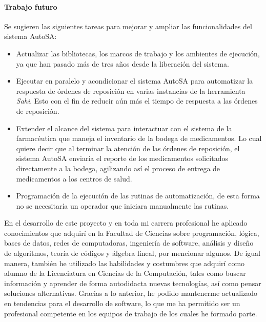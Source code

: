 \paragraph{Trabajo futuro\\}
Se sugieren las siguientes tareas para mejorar y ampliar las funcionalidades del sistema AutoSA:
\begin{itemize}
	\item Actualizar las bibliotecas, los marcos de trabajo y los ambientes de ejecución, ya que han pasado más de tres años desde la liberación del sistema.
	\item Ejecutar en paralelo y acondicionar el sistema AutoSA para automatizar la respuesta de órdenes de reposición en varias instancias de la herramienta \textit{Sahi}. Esto con el fin de reducir aún más el tiempo de respuesta a las órdenes de reposición.
	\item Extender el alcance del sistema para interactuar con el sistema de la farmacéutica que maneja el inventario de la bodega de medicamentos. Lo cual quiere decir que al terminar la atención de las órdenes de reposición, el sistema AutoSA enviaría el reporte de los medicamentos solicitados directamente a la bodega, agilizando así el proceso de entrega de medicamentos a los centros de salud. 
	\item Programación de la ejecución de las rutinas de automatización, de esta forma no se necesitaría un operador que iniciara manualmente las rutinas.
\end{itemize}
En el desarrollo de este proyecto y en toda mi carrera profesional he aplicado conocimientos que adquirí en la Facultad de Ciencias sobre programación, lógica, bases de datos, redes de computadoras, ingeniería de software, análisis y diseño de algoritmos, teoría de códigos y álgebra lineal, por mencionar algunos. De igual manera, también he utilizado las habilidades y costumbres que adquirí como alumno de la Licenciatura en Ciencias de la Computación, tales como buscar información y aprender de forma autodidacta nuevas tecnologías, así como pensar soluciones alternativas. Gracias a lo anterior, he podido mantenerme actualizado en tendencias para el desarrollo de software, lo que me ha permitido ser un profesional competente en los equipos de trabajo de los cuales he formado parte.\\
